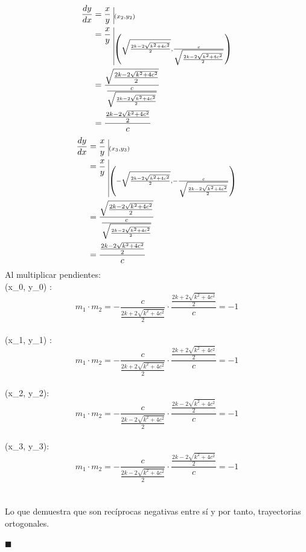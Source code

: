 \documentclass[12pt]{article}
\begin{document}
\begin{equation*}
  \begin{split}
    \frac{dy}{dx}
    &= \frac{x}{y} ~ \vline _{(x_2,y_2)}\\
    &= \frac{x}{y} ~ \vline _{\left(\sqrt{\frac{2k-2\sqrt{k^2+4c^2}}{2}}, \frac{c}{\sqrt{\frac{2k-2\sqrt{k^2+4c^2}}{2}}}\right)}\\
    &= \frac{\sqrt{\frac{2k-2\sqrt{k^2+4c^2}}{2}}}{\frac{c}{\sqrt{\frac{2k-2\sqrt{k^2+4c^2}}{2}}}}\\
    &= \frac {  \frac {2k-2\sqrt{k^2+4c^2}}  {2}  } {c}\\
  \end{split}
\end{equation*}
\begin{equation*}
  \begin{split}
    \frac{dy}{dx}
    &= \frac{x}{y} ~ \vline _{(x_3, y_3)}\\
    &= \frac{x}{y} ~ \vline _{\left(-\sqrt{\frac{2k-2\sqrt{k^2+4c^2}}{2}}, -\frac{c}{\sqrt{\frac{2k-2\sqrt{k^2+4c^2}}{2}}}\right)}\\
    &= \frac{\sqrt{\frac{2k-2\sqrt{k^2+4c^2}}{2}}}{\frac{c}{\sqrt{\frac{2k-2\sqrt{k^2+4c^2}}{2}}}}\\
    &= \frac {  \frac {2k-2\sqrt{k^2+4c^2}}  {2}  } {c}\\
  \end{split}
\end{equation*}
Al multiplicar pendientes:\\
(x_0, y_0) : ~ ~
\[
  m_1 \cdot m_2 = -\frac{c}{ \frac{2k+2\sqrt{k^2+4c^2}}{2} }    \cdot  \frac {  \frac {2k+2\sqrt{k^2+4c^2}}  {2}  }{ c} = -1
 \] \\
(x_1, y_1) : ~ ~
\[
  m_1 \cdot m_2 = - \frac {c}{ \frac {2k+2\sqrt{k^2+4c^2}} {2}} \cdot \frac {  \frac {2k+2\sqrt{k^2+4c^2}}  {2}  } {c} =- 1
\]\\
(x_2, y_2):~ ~
\[
  m_1 \cdot m_2 = -\frac {c}{ \frac {2k-2\sqrt{k^2+4c^2}} {2}} \cdot \frac {  \frac {2k-2\sqrt{k^2+4c^2}}  {2}  } {c} = -1
  \]\\ 
(x_3, y_3): ~ ~
\[
  m_1 \cdot m_2 =  - \frac {c}{ \frac {2k-2\sqrt{k^2+4c^2}} {2}} \cdot   \frac {  \frac {2k-2\sqrt{k^2+4c^2}}  {2}  } {c} = -1
  \] \\ \\
Lo que demuestra que son recíprocas negativas entre sí y por tanto, trayectorias ortogonales.
\begin{flushright}
$\blacksquare$
\end{flushright}
\end{document}
